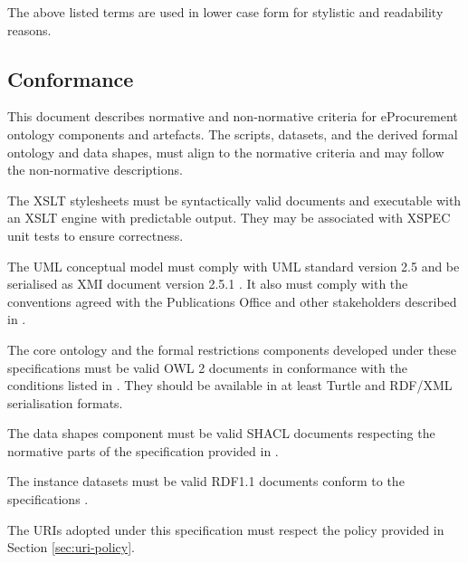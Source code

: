 	The above listed terms are used in lower case form for stylistic and readability reasons. 
	
	\subsection{Conformance}
	
	This document describes normative and non-normative criteria for eProcurement ontology components and artefacts. The scripts, datasets, and the derived formal ontology and data shapes, must align to the normative criteria and may follow the non-normative descriptions. 
	
	The XSLT stylesheets \citep{xslt3-Kay} must be syntactically valid documents and executable with an XSLT engine with predictable output. They may be associated with XSPEC unit tests \cite{xspec-cirulli2017xspec} to ensure correctness.
	
	The UML conceptual model must comply with UML standard version 2.5 \citep{uml2.5} and be serialised as XMI document version 2.5.1 \cite{xmi2.5.1}. It also must comply with the conventions agreed with the Publications Office and other stakeholders described in \citet{costetchi2020b}.
	
	The core ontology and the formal restrictions components developed under these specifications must be valid OWL 2 documents in conformance with the conditions listed in \citet{owl2-comformance}. They should be available in at least Turtle and \mbox{RDF/XML} serialisation formats.
	
	The data shapes component must be valid SHACL documents respecting the normative parts of the specification provided in \cite{shacl-spec}.
	
	The instance datasets must be valid RDF1.1 documents conform to the specifications \cite{rdfs11-spec}.
	
	The URIs adopted under this specification must respect the policy provided in Section \ref{sec:uri-policy}.
	
	